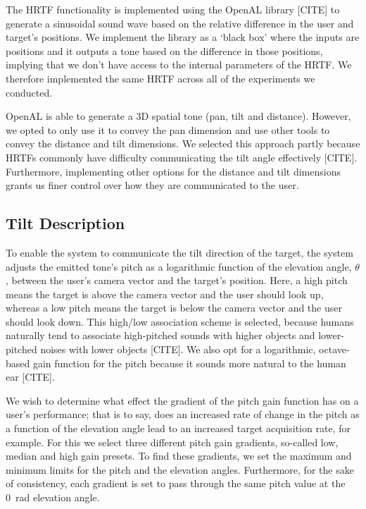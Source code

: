 \documentclass[format=sigconf, review=true, screen=true, anonymous=true]{acmart}
\begin{document}
The HRTF functionality is implemented using the OpenAL library [CITE] to generate a sinusoidal sound wave based on the relative difference in the user and target's positions. We implement the library as a `black box' where the inputs are positions and it outputs a tone based on the difference in those positions, implying that we don't have access to the internal parameters of the HRTF. We therefore implemented the same HRTF across all of the experiments we conducted.  

OpenAL is able to generate a 3D spatial tone (pan, tilt and distance). However, we opted to only use it to convey the pan dimension and use other tools to convey the distance and tilt dimensions. We selected this approach partly because HRTFs commonly have difficulty communicating the tilt angle effectively [CITE]. Furthermore, implementing other options for the distance and tilt dimensions grants us finer control over how they are communicated to the user.

\subsection{Tilt Description}

To enable the system to communicate the tilt direction of the target, the system adjusts the emitted tone's pitch as a logarithmic function of the elevation angle, $\theta$, between the user's camera vector and the target's position. Here, a high pitch means the target is above the camera vector and the user should look up, whereas a low pitch means the target is below the camera vector and the user should look down. This high/low association scheme is selected, because humans naturally tend to associate high-pitched sounds with higher objects and lower-pitched noises with lower objects [CITE]. We also opt for a logarithmic, octave-based gain function for the pitch because it sounds more natural to the human ear [CITE].

We wish to determine what effect the gradient of the pitch gain function has on a user's performance; that is to say, does an increased rate of change in the pitch as a function of the elevation angle lead to an increased target acquisition rate, for example. For this we select three different pitch gain gradients, so-called low, median and high gain presets. To find these gradients, we set the maximum and minimum limits for the pitch and the elevation angles. Furthermore, for the sake of consistency, each gradient is set to pass through the same pitch value at the \SI{0}{\radian} elevation angle.   
\end{document}
